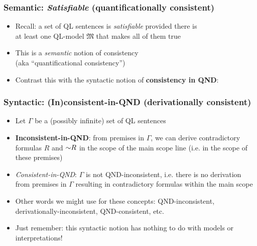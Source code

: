 \begin{frame}
\frametitle{Semantic: \emph{Satisfiable} (quantificationally consistent)}

\begin{itemize}[<+->]

\item Recall: a set of QL sentences is \emph{satisfiable} provided there is \\at least one QL-model $\mathfrak{M}$ that makes all of them true


\item This is a \textit{semantic} notion of consistency \\ (aka ``quantificational consistency'')  


\item Contrast this with the syntactic notion of \textbf{consistency in QND}:

\end{itemize}
\end{frame}




\begin{frame}
\frametitle{Syntactic: (In)consistent-in-QND (derivationally consistent)}

\begin{itemize}[<+->]

\item Let $\Gamma$ be a (possibly infinite) set of QL sentences 

\item \textbf{\textcolor{OGlyallpink}{Inconsistent-in-QND}}: from premises in $\Gamma$, we can derive contradictory formulas $R$ and $\enot R$ in the scope of the main scope line (i.e. in the scope of these premises)

\item \emph{Consistent-in-QND}: $\Gamma$ is not QND-inconsistent, i.e. there is no derivation from premises in $\Gamma$ resulting in contradictory formulas within the main scope

\item Other words we might use for these concepts: QND-inconsistent, derivationally-inconsistent, QND-consistent, etc.

\item Just remember: this syntactic notion has nothing to do with models or interpretations!

\end{itemize}
\end{frame}



